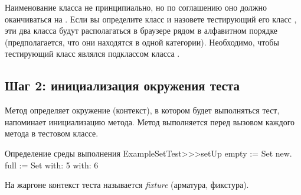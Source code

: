 \documentclass[a4paper,10pt,twoside]{book}
\begin{document}
Наименование класса не принципиально, но по соглашению оно должно оканчиваться на .
Если вы определите класс  и назовете тестирующий его класс ,
эти два класса будут располагаться в браузере рядом в алфавитном порядке
(предполагается, что они находятся в одной категории).
Необходимо, чтобы тестирующий класс являлся подклассом класса .
\subsection{Шаг 2: инициализация окружения теста}

Метод  определяет окружение (контекст), в котором будет выполняться тест,
напоминает инициализацию метода.
Метод  выполняется перед вызовом каждого метода в тестовом классе.


\begin{method}[setupExampleSetTest]{Определение среды выполнения}
ExampleSetTest>>>setUp
	empty := Set new.
	full := Set with: 5 with: 6
\end{method}

\noindent
На жаргоне контекст теста называется \emph{fixture} (арматура, фикстура).
\end{document}
